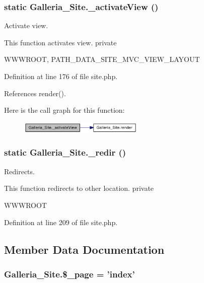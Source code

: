 \subsubsection{\setlength{\rightskip}{0pt plus 5cm}static Galleria\_\-Site.\_\-activateView ()\hspace{0.3cm}{\tt  [static, protected]}}\label{classGalleria__Site_4182ad469dc58ec4b50164c7b227af8d}


Activate view.

This function activates view.  private

WWWROOT, PATH\_\-DATA\_\-SITE\_\-MVC\_\-VIEW\_\-LAYOUT 

Definition at line 176 of file site.php.

References render().

Here is the call graph for this function:\nopagebreak
\begin{figure}[H]
\begin{center}
\leavevmode
\includegraphics[width=168pt]{classGalleria__Site_4182ad469dc58ec4b50164c7b227af8d_cgraph}
\end{center}
\end{figure}
\subsubsection{\setlength{\rightskip}{0pt plus 5cm}static Galleria\_\-Site.\_\-redir ()\hspace{0.3cm}{\tt  [static, protected]}}\label{classGalleria__Site_5cd7b65e4380a16ae7ef0a28e00e8e70}


Redirects.

This function redirects to other location.  private

WWWROOT 

Definition at line 209 of file site.php.

\subsection{Member Data Documentation}
\subsubsection{\setlength{\rightskip}{0pt plus 5cm}Galleria\_\-Site.\$\_\-page = 'index'\hspace{0.3cm}{\tt  [static, protected]}}\label{classGalleria__Site_6e027e589d9165b9cd4ccea0584a6477}




